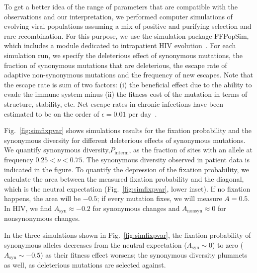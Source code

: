 \documentclass[rmp, twocolumn]{revtex4}
\newcommand{\FIG}[1]{Fig.~\ref{fig:#1}}
\begin{document}
To get a better idea of the range of parameters that are compatible with the
observations and our interpretation, we performed computer simulations of
evolving viral populations assuming a mix of positive and purifying selection
and rare recombination.
For this purpose, we use the simulation package FFPopSim, which includes a
module dedicated to intrapatient HIV evolution~\citep{zanini_ffpopsim:_2012}. 
For each simulation run, we specify the deleterious effect of synonymous
mutations, the fraction of synonymous mutations that are deleterious, the
escape rate of adaptive non-synonymous mutations and the frequency of new
escapes. Note that the escape rate is sum of two factors: (i) the beneficial
effect due to the ability to evade the immune system minus (ii) the fitness
cost of the mutation in terms of structure, stability, etc. Net escape rates
in chronic infections have been estimated to be on the order of 
$\epsilon = 0.01$ per day~\citep{neher_recombination_2010,Asquith:2006p28003}.


\FIG{simfixpvar} shows simulations results for the fixation probability and the
synonymous diversity for different deleterious effects of synonymous mutations. 
We quantify synonymous diversity,$P_\text{interm}$, as the fraction of sites
with an allele at frequency $0.25 < \nu < 0.75$. The synonymous diversity
observed in patient data is indicated in the figure.
To quantify the depression of the fixation probability, we calculate
the area between the measured fixation probability and the diagonal, which is
the neutral expectation (\FIG{simfixpvar}, lower inset). If no fixation happens,
the area will be $-0.5$; if every mutation fixes, we will measure 
$A= 0.5$. In HIV, we find $A_\text{syn} \approx -0.2$  for
synonymous changes and $A_\text{nonsyn} \approx 0$ for nonsynonymous changes.

In the three simulations shown in \FIG{simfixpvar}, the fixation probability of
synonymous alleles decreases from the neutral expectation ($A_\text{syn} \sim 0$) to zero
($A_\text{syn} \sim -0.5$) as their fitness effect
worsens; the synonymous diversity plummets as well, as deleterious mutations
are selected against.
\end{document}
